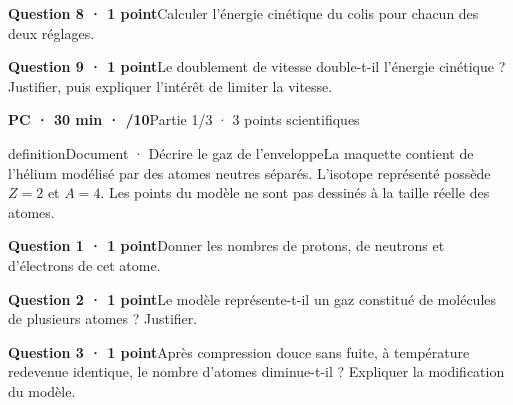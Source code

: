 \par\addvspace{3mm}\noindent\begin{minipage}{\linewidth}\textbf{Question 8 · 1 point}\quad Calculer l’énergie cinétique du colis pour chacun des deux réglages.\par\end{minipage}\par
\par\addvspace{3mm}\noindent\begin{minipage}{\linewidth}\textbf{Question 9 · 1 point}\quad Le doublement de vitesse double-t-il l’énergie cinétique ? Justifier, puis expliquer l’intérêt de limiter la vitesse.\par\end{minipage}\par
\vfill{}
\label{ann-15}
\textbf{PC · 30 min · /10}\hfill Partie 1/3 · 3 points scientifiques
\begin{pcEncadre}{definition}{Document · Décrire le gaz de l’enveloppe}La maquette contient de l’hélium modélisé par des atomes neutres séparés. L’isotope représenté possède $Z=2$ et $A=4$. Les points du modèle ne sont pas dessinés à la taille réelle des atomes.\end{pcEncadre}
\par\addvspace{3mm}\noindent\begin{minipage}{\linewidth}\textbf{Question 1 · 1 point}\quad Donner les nombres de protons, de neutrons et d’électrons de cet atome.\par\end{minipage}\par
\par\addvspace{3mm}\noindent\begin{minipage}{\linewidth}\textbf{Question 2 · 1 point}\quad Le modèle représente-t-il un gaz constitué de molécules de plusieurs atomes ? Justifier.\par\end{minipage}\par
\par\addvspace{3mm}\noindent\begin{minipage}{\linewidth}\textbf{Question 3 · 1 point}\quad Après compression douce sans fuite, à température redevenue identique, le nombre d’atomes diminue-t-il ? Expliquer la modification du modèle.\par\end{minipage}\par
